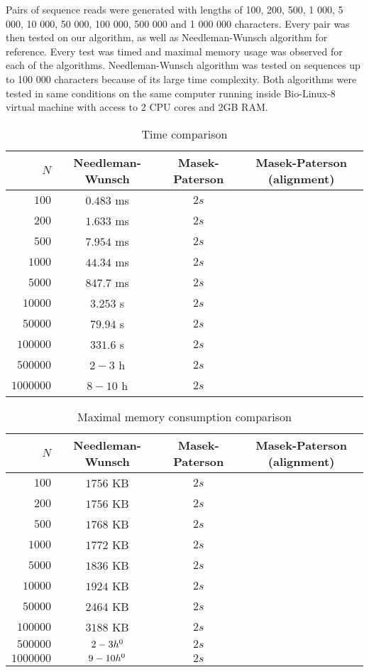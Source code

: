 \documentclass[times, utf8, seminar, numeric]{fer}
\begin{document}
Pairs of sequence reads were generated with lengths of 100, 200, 500, 1 000, 5 000, 10 000, 50 000, 100 000, 500 000 and 1 000 000 characters. Every pair was then tested on our algorithm, as well as Needleman-Wunsch algorithm for reference. Every test was timed and maximal memory usage was observed for each of the algorithms. Needleman-Wunsch algorithm was tested on sequences up to 100 000 characters because of its large time complexity. Both algorithms were tested in same conditions on the same computer running inside Bio-Linux-8 virtual machine with access to 2 CPU cores and 2GB RAM.
\begin{table}[h]
\centering
\begin{tabular}{rccc}
$N$ & Needleman-Wunsch & Masek-Paterson & Masek-Paterson (alignment)\\
\hline
$      100 $&$ 0.483$ ms&$ 2s$ \\
$      200 $&$ 1.633$ ms&$ 2s $ \\
$      500 $&$ 7.954$ ms&$ 2s $\\
$    1 000 $&$ 44.34$ ms&$ 2s $\\
$    5 000 $&$ 847.7$ ms&$ 2s $\\
$   10 000 $&$ 3.253$ s&$ 2s $\\
$   50 000 $&$ 79.94$ s&$ 2s $\\
$  100 000 $&$ 331.6$ s&$ 2s $\\
$  500 000 $&$ 2 - 3$ h \footnotemark &$ 2s $\\
$1 000 000 $&$ 8 - 10$ h \footnotemark[\value{footnote}] &$ 2s $\\
\end{tabular}
\caption{Time comparison}
\end{table}
\begin{table}[h]
\centering
\begin{tabular}{rccc}
$N$ & Needleman-Wunsch & Masek-Paterson & Masek-Paterson (alignment) \\
\hline
$      100 $&$ 1756$ KB &$ 2s$ \\
$      200 $&$ 1756$ KB&$ 2s $ \\
$      500 $&$ 1768$ KB&$ 2s $\\
$    1 000 $&$ 1772$ KB&$ 2s $\\
$    5 000 $&$ 1836$ KB&$ 2s $\\
$   10 000 $&$ 1924$ KB&$ 2s $\\
$   50 000 $&$ 2464$ KB&$ 2s $\\
$  100 000 $&$ 3188$ KB&$ 2s $\\
$  500 000 $&$ 2 - 3h \footnotemark[\value{footnote}] $&$ 2s $\\
$1 000 000 $&$ 9 - 10h \footnotemark[\value{footnote}] $&$ 2s $\\
\end{tabular}
\caption{Maximal memory consumption comparison}
\end{table}
\end{document}
